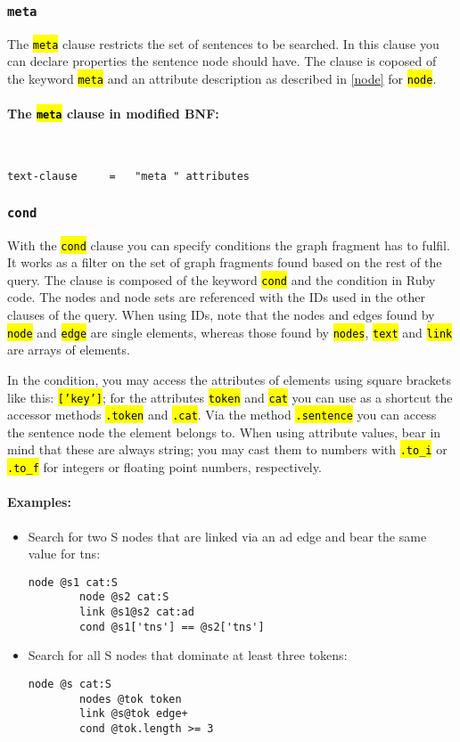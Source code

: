 \documentclass[12pt]{scrartcl}
\newcommand{\code}[1]{\hl{\texttt{#1}}}
\begin{document}
\subsubsection{\texttt{meta}}

The \code{meta} clause restricts the set of sentences to be searched.
In this clause you can declare properties the sentence node should have.
The clause is coposed of the keyword \code{meta} and an attribute description as described in \ref{node} for \code{node}.

\paragraph*{The \code{meta} clause in modified BNF:}
~
\begin{lstlisting}
text-clause     =   "meta " attributes
\end{lstlisting}


\subsubsection{\texttt{cond}}\label{cond}

With the \code{cond} clause you can specify conditions the graph fragment has to fulfil.
It works as a filter on the set of graph fragments found based on the rest of the query.
The clause is composed of the keyword \code{cond} and the condition in Ruby code.
The nodes and node sets are referenced with the IDs used in the other clauses of the query.
When using IDs, note that the nodes and edges found by \code{node} and \code{edge} are single elements, whereas those found by \code{nodes}, \code{text} and \code{link} are arrays of elements.

In the condition, you may access the attributes of elements using square brackets like this: \code{['key']}; for the attributes \code{token} and \code{cat} you can use as a shortcut the accessor methods \code{.token} and \code{.cat}.
Via the method \code{.sentence} you can access the sentence node the element belongs to.
When using attribute values, bear in mind that these are always string; you may cast them to numbers with \code{.to\_i} or \code{.to\_f} for integers or floating point numbers, respectively.


\paragraph*{Examples:}
\begin{itemize}
	\item Search for two S nodes that are linked via an ad edge and bear the same value for tns:
	\begin{lstlisting}[gobble=8,aboveskip=.6em,belowskip=.2em]
		node @s1 cat:S
		node @s2 cat:S
		link @s1@s2 cat:ad
		cond @s1['tns'] == @s2['tns']
	\end{lstlisting}
	\item Search for all S nodes that dominate at least three tokens:
	\begin{lstlisting}[gobble=8,aboveskip=.6em,belowskip=.2em]
		node @s cat:S
		nodes @tok token
		link @s@tok edge+
		cond @tok.length >= 3
	\end{lstlisting}
\end{itemize}
\end{document}
